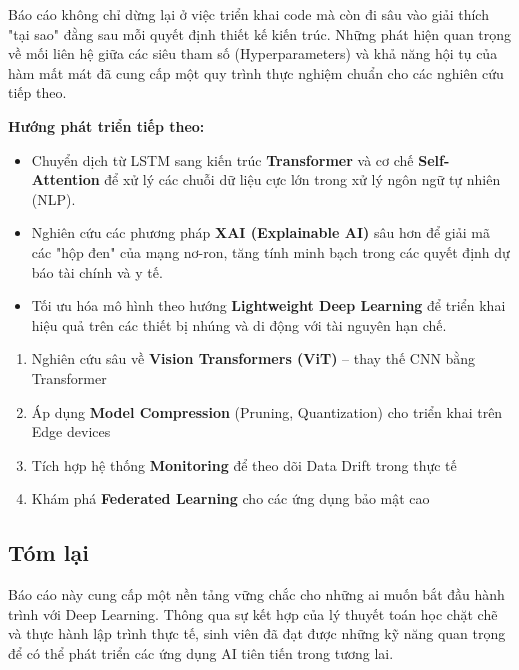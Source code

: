 \documentclass[12pt, a4paper]{article}
\begin{document}
Báo cáo không chỉ dừng lại ở việc triển khai code mà còn đi sâu vào giải thích "tại sao" đằng sau mỗi quyết định thiết kế kiến trúc. Những phát hiện quan trọng về mối liên hệ giữa các siêu tham số (Hyperparameters) và khả năng hội tụ của hàm mất mát đã cung cấp một quy trình thực nghiệm chuẩn cho các nghiên cứu tiếp theo.

\textbf{Hướng phát triển tiếp theo:}
\begin{itemize}
    \item Chuyển dịch từ LSTM sang kiến trúc \textbf{Transformer} và cơ chế \textbf{Self-Attention} để xử lý các chuỗi dữ liệu cực lớn trong xử lý ngôn ngữ tự nhiên (NLP).
    \item Nghiên cứu các phương pháp \textbf{XAI (Explainable AI)} sâu hơn để giải mã các "hộp đen" của mạng nơ-ron, tăng tính minh bạch trong các quyết định dự báo tài chính và y tế.
    \item Tối ưu hóa mô hình theo hướng \textbf{Lightweight Deep Learning} để triển khai hiệu quả trên các thiết bị nhúng và di động với tài nguyên hạn chế.
\end{itemize}

\begin{enumerate}
    \item Nghiên cứu sâu về \textbf{Vision Transformers (ViT)} -- thay thế CNN bằng Transformer
    \item Áp dụng \textbf{Model Compression} (Pruning, Quantization) cho triển khai trên Edge devices
    \item Tích hợp hệ thống \textbf{Monitoring} để theo dõi Data Drift trong thực tế
    \item Khám phá \textbf{Federated Learning} cho các ứng dụng bảo mật cao
\end{enumerate}

\subsection*{Tóm lại}

Báo cáo này cung cấp một nền tảng vững chắc cho những ai muốn bắt đầu hành trình với Deep Learning. Thông qua sự kết hợp của lý thuyết toán học chặt chẽ và thực hành lập trình thực tế, sinh viên đã đạt được những kỹ năng quan trọng để có thể phát triển các ứng dụng AI tiên tiến trong tương lai.

\newpage
\end{document}
